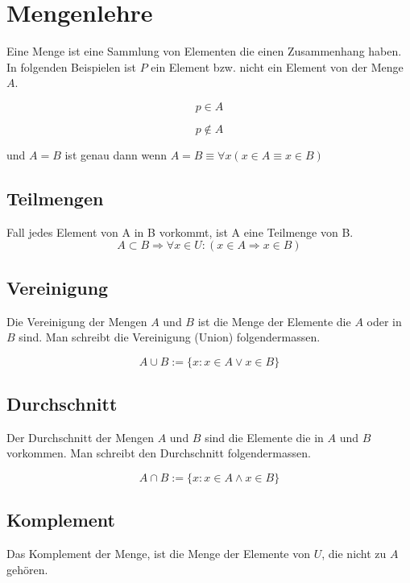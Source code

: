 \documentclass[12pt, a4paper, oneside]{article}
\begin{document}
\section{Mengenlehre}
Eine Menge ist eine Sammlung von Elementen die einen Zusammenhang haben. In folgenden Beispielen ist $P$ ein Element bzw. nicht ein Element von der Menge $A$.
 
\begin{equation*}
  p \in A
\end{equation*}

\begin{equation*}
  p \notin A
\end{equation*}

und $A = B$ ist genau dann wenn $A = B \equiv \forall x (x \in A \equiv x \in B)$

\subsection{Teilmengen}
Fall jedes Element von A in B vorkommt, ist A eine Teilmenge von B.
\begin{equation*}
  A \subset B \Rightarrow \forall x \in U : (x \in A \Rightarrow x \in B)
\end{equation*}

\subsection{Vereinigung}
Die Vereinigung der Mengen $A$ und $B$ ist die Menge der Elemente die $A$ oder in $B$ sind. Man schreibt die Vereinigung (Union) folgendermassen.

\begin{equation*}
  A \cup B := \{x : x \in A \lor x \in B\}
\end{equation*}

\subsection{Durchschnitt}
Der Durchschnitt der Mengen $A$ und $B$ sind die Elemente die in $A$ und $B$ vorkommen. Man schreibt den Durchschnitt folgendermassen.

\begin{equation*}
  A \cap B := \{x : x \in A \land x \in B\}
\end{equation*}

\subsection{Komplement}
Das Komplement der Menge, ist die Menge der Elemente von $U$, die nicht zu $A$ gehören.
\end{document}
